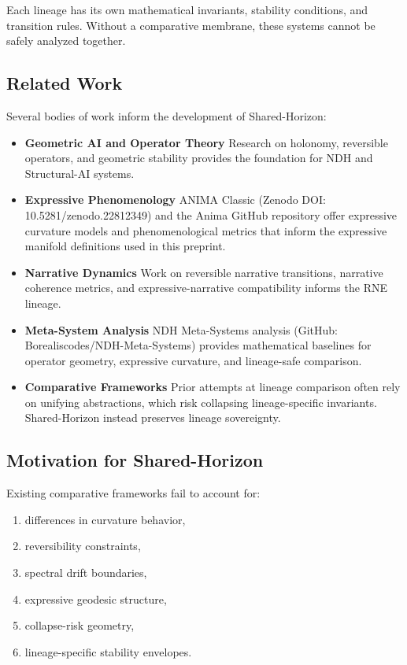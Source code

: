 Each lineage has its own mathematical invariants, stability conditions, and
transition rules. Without a comparative membrane, these systems cannot be safely
analyzed together.

\subsection{Related Work}

Several bodies of work inform the development of Shared-Horizon:

\begin{itemize}
    \item \textbf{Geometric AI and Operator Theory}  
    Research on holonomy, reversible operators, and geometric stability provides
    the foundation for NDH and Structural-AI systems.

    \item \textbf{Expressive Phenomenology}  
    ANIMA Classic (Zenodo DOI: 10.5281/zenodo.22812349) and the Anima GitHub
    repository offer expressive curvature models and phenomenological metrics
    that inform the expressive manifold definitions used in this preprint.

    \item \textbf{Narrative Dynamics}  
    Work on reversible narrative transitions, narrative coherence metrics, and
    expressive-narrative compatibility informs the RNE lineage.

    \item \textbf{Meta-System Analysis}  
    NDH Meta-Systems analysis
    (GitHub: Borealiscodes/NDH-Meta-Systems) provides mathematical baselines for
    operator geometry, expressive curvature, and lineage-safe comparison.

    \item \textbf{Comparative Frameworks}  
    Prior attempts at lineage comparison often rely on unifying abstractions,
    which risk collapsing lineage-specific invariants. Shared-Horizon instead
    preserves lineage sovereignty.
\end{itemize}

\subsection{Motivation for Shared-Horizon}

Existing comparative frameworks fail to account for:

\begin{enumerate}
    \item differences in curvature behavior,
    \item reversibility constraints,
    \item spectral drift boundaries,
    \item expressive geodesic structure,
    \item collapse-risk geometry,
    \item lineage-specific stability envelopes.
\end{enumerate}

